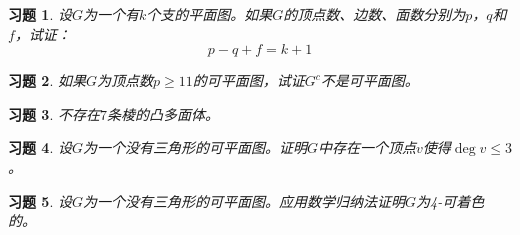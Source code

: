 \documentclass{article}
\begin{document}
\begin{CJK}{UTF8}{gbsn}
\newtheorem{Exercise}{习题}
\begin{Exercise}
    设$G$为一个有$k$个支的平面图。如果$G$的顶点数、边数、面数分别为$p$，$q$和$f$，试证：
  \[p-q+f=k+1\]
\end{Exercise}
\vspace{10cm}
\begin{Exercise}
    如果$G$为顶点数$p\geq 11$的可平面图，试证$G^c$不是可平面图。
\end{Exercise}
\vspace{10cm}
\begin{Exercise}
    不存在$7$条棱的凸多面体。
\end{Exercise}
\vspace{10cm}
\begin{Exercise}
    设$G$为一个没有三角形的可平面图。证明$G$中存在一个顶点$v$使得$\deg v \leq 3$。
\end{Exercise}
\vspace{10cm}
\begin{Exercise}
    设$G$为一个没有三角形的可平面图。应用数学归纳法证明$G$为4-可着色的。
\end{Exercise}
\end{CJK}
\end{document}
